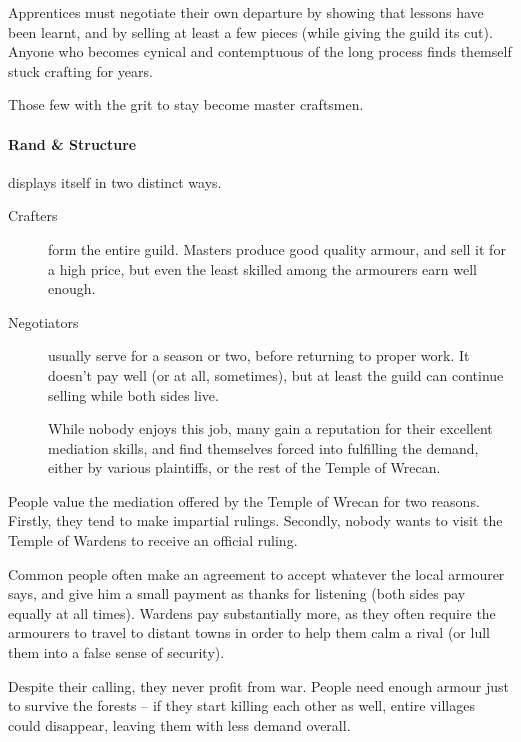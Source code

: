 \begin{multicols}{2}
Apprentices must negotiate their own departure by showing that lessons have been learnt, and by selling at least a few pieces (while giving the guild its cut).
Anyone who becomes cynical and contemptuous of the long process finds themself stuck crafting for years.

Those few with the grit to stay become master craftsmen.

\paragraph{Rand \& Structure}
displays itself in two distinct ways.

\begin{description}
  \item[Crafters]
  form the entire guild.
  Masters produce good quality armour, and sell it for a high price, but even the least skilled among the armourers earn well enough.
  \item[Negotiators]
  usually serve for a season or two, before returning to proper work.
  It doesn't pay well (or at all, sometimes), but at least the guild can continue selling while both sides live.

  While nobody enjoys this job, many gain a reputation for their excellent mediation skills, and find themselves forced into fulfilling the demand, either by various plaintiffs, or the rest of the Temple of Wrecan.
\end{description}

People value the mediation offered by the Temple of Wrecan for two reasons.
Firstly, they tend to make impartial rulings.
Secondly, nobody wants to visit the Temple of Wardens to receive an official ruling.

Common people often make an agreement to accept whatever the local armourer says, and give him a small payment as thanks for listening (both sides pay equally at all times).
Wardens pay substantially more, as they often require the armourers to travel to distant towns in order to help them calm a rival (or lull them into a false sense of security).

Despite their calling, they never profit from war.
People need enough armour just to survive the forests -- if they start killing each other as well, entire villages could disappear, leaving them with less demand overall.

\end{multicols}
